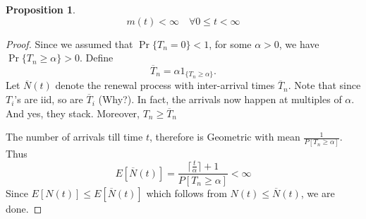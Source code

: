 \documentclass[a4paper,10pt]{article}
\theoremstyle{plain}
\newtheorem{prop}[thm]{Proposition}
\theoremstyle{definition}
\theoremstyle{remark}
\begin{document}
\begin{prop}
\begin{equation*} 
m(t) < \infty \quad \forall 0 \leq t < \infty
\end{equation*}
\end{prop}
\begin{proof}
Since we assumed that $\Pr\{T_n = 0\} < 1$, for some $\alpha > 0$, we have $\Pr\{T_n \geq \alpha\} >0$. Define
\begin{equation*}
\overline{T}_n = \alpha 1_{\{T_n \geq \alpha\}}.
\end{equation*}
Let $\overline{N}(t)$ denote the renewal process with inter-arrival times $\overline{T}_n$. Note that since $T_i$'s are iid, so are $\overline{T}_i$ (Why?). In fact, the arrivals now happen at multiples of $\alpha$. And yes, they stack. Moreover, $T_n \geq \overline{T}_n$

The number of arrivals till time $t$, therefore is Geometric with mean $\frac{1}{P[T_n \geq \alpha]}$. Thus 
\begin{equation*}
E[\overline{N}(t)] = \frac{\lceil\frac{t}{\alpha} \rceil + 1}{P[T_n \geq \alpha]} < \infty
\end{equation*}
Since $E[N(t)] \leq E[\overline{N}(t)]$ which follows from $N(t) \leq \overline{N}(t)$, we are done.
\end{proof}
\end{document}
